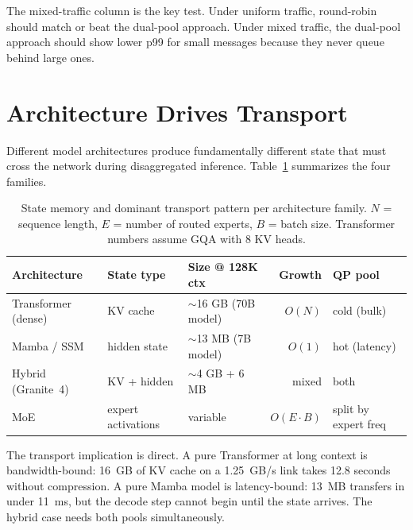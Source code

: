 \documentclass[11pt,letterpaper]{article}
\begin{document}
The mixed-traffic column is the key test. Under uniform traffic, round-robin should match or beat the dual-pool approach. Under mixed traffic, the dual-pool approach should show lower p99 for small messages because they never queue behind large ones.

\section{Architecture Drives Transport}
\label{sec:arch_drives}

Different model architectures produce fundamentally different state that must cross the network during disaggregated inference. Table~\ref{tab:arch_traffic} summarizes the four families.

\begin{table}[ht]
\centering\small
\begin{tabular}{lllrl}
\toprule
\textbf{Architecture} & \textbf{State type} & \textbf{Size @ 128K ctx} & \textbf{Growth} & \textbf{QP pool} \\
\midrule
Transformer (dense) & KV cache & $\sim$16 GB (70B model) & $O(N)$ & cold (bulk) \\
Mamba / SSM & hidden state & $\sim$13 MB (7B model) & $O(1)$ & hot (latency) \\
Hybrid (Granite~4) & KV + hidden & $\sim$4 GB + 6 MB & mixed & both \\
MoE & expert activations & variable & $O(E \cdot B)$ & split by expert freq \\
\bottomrule
\end{tabular}
\caption{State memory and dominant transport pattern per architecture family. $N$ = sequence length, $E$ = number of routed experts, $B$ = batch size. Transformer numbers assume GQA with 8 KV heads.}
\label{tab:arch_traffic}
\end{table}

The transport implication is direct. A pure Transformer at long context is bandwidth-bound: 16~GB of KV cache on a 1.25~GB/s link takes 12.8 seconds without compression. A pure Mamba model is latency-bound: 13~MB transfers in under 11~ms, but the decode step cannot begin until the state arrives. The hybrid case needs both pools simultaneously.
\end{document}

